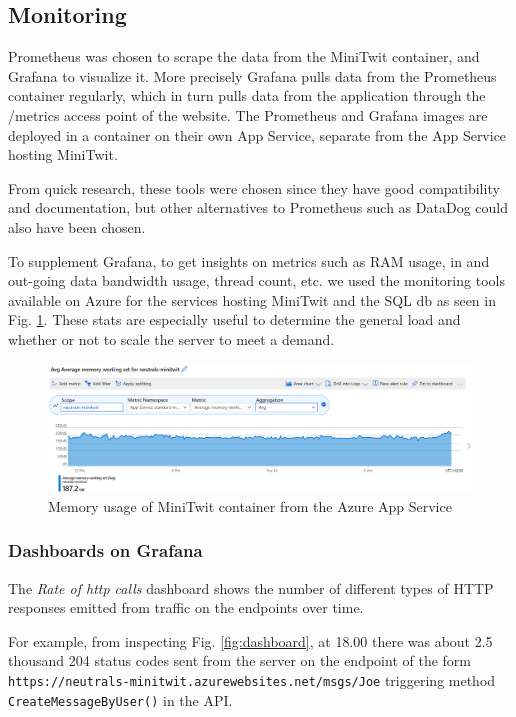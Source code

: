 \documentclass{article}
\begin{document}
\subsection{Monitoring}
Prometheus was chosen to scrape the data from the MiniTwit container, and Grafana to visualize it. More precisely Grafana pulls data from the Prometheus container regularly, which in turn pulls data from the application through the /metrics access point of the website. The Prometheus and Grafana images are deployed in a container on their own App Service, separate from the App Service hosting MiniTwit.

From quick research, these tools were chosen since they have good compatibility and documentation, but other alternatives to Prometheus such as DataDog could also have been chosen.

To supplement Grafana, to get insights on metrics such as RAM usage, in and out-going data bandwidth usage, thread count, etc. we used the monitoring tools available on Azure for the services hosting MiniTwit and the SQL db as seen in Fig. \ref{fig:RAM}. These stats are especially useful to determine the general load and whether or not to scale the server to meet a demand.  
\begin{figure}[H]
\centering
\includegraphics[width=1\textwidth]{images/azure-mem-usage.png}
\caption{\label{fig:RAM} Memory usage of MiniTwit container from the Azure App Service}
\end{figure}

\subsubsection{Dashboards on Grafana}
The \emph{Rate of http calls} dashboard shows the number of different types of HTTP responses emitted from traffic on the endpoints over time. 

For example, from inspecting Fig. \ref{fig:dashboard}, at 18.00 there was about 2.5 thousand 204 status codes sent from the server on the endpoint of the form \texttt{https://neutrals-minitwit.azurewebsites.net/msgs/Joe}
triggering method \texttt{CreateMessageByUser()} in the API.     
\end{document}
